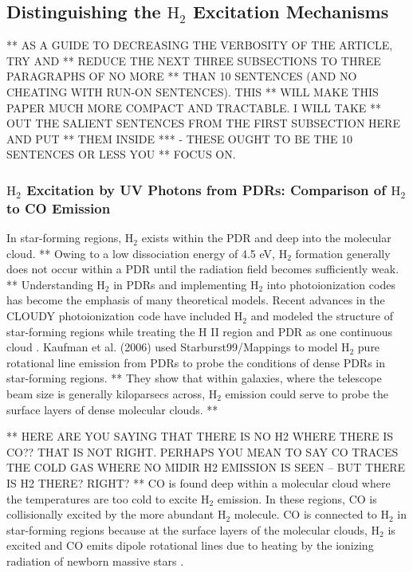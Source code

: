\documentclass[manuscript]{aastex}
\begin{document}
\subsection{Distinguishing the $\mathrm{H_2}$ Excitation Mechanisms}

** AS A GUIDE TO DECREASING THE VERBOSITY OF THE ARTICLE, TRY AND
** REDUCE THE NEXT THREE SUBSECTIONS TO THREE PARAGRAPHS OF NO MORE
** THAN 10 SENTENCES (AND NO CHEATING WITH RUN-ON SENTENCES).  THIS
** WILL MAKE THIS PAPER MUCH MORE COMPACT AND TRACTABLE. I WILL TAKE
** OUT THE SALIENT SENTENCES FROM THE FIRST SUBSECTION HERE AND PUT
** THEM INSIDE *** - THESE OUGHT TO BE THE 10 SENTENCES OR LESS YOU
** FOCUS ON.

\subsubsection{$\mathrm{H_2}$ Excitation by UV Photons from PDRs: Comparison of $\mathrm{H_2}$ to CO Emission}

In star-forming regions, $\mathrm{H_2}$ exists within the PDR and deep
into the molecular cloud.  ** Owing to a low dissociation energy of 4.5
eV, $\mathrm{H_2}$ formation generally does not occur within a PDR
until the radiation field becomes sufficiently weak.  ** Understanding
$\mathrm{H_2}$ in PDRs and implementing $\mathrm{H_2}$ into
photoionization codes has become the emphasis of many theoretical
models.  Recent advances in the CLOUDY photoionization code have
included $\mathrm{H_2}$ and modeled the structure of star-forming
regions while treating the H II region and PDR as one continuous cloud
\citep{shaw05, abel05}.  Kaufman et al. (2006) used
Starburst99/Mappings to model $\mathrm{H_2}$ pure rotational line
emission from PDRs to probe the conditions of dense PDRs in
star-forming regions.  ** They show that within galaxies, where the
telescope beam size is generally kiloparsecs across, $\mathrm{H_2}$
emission could serve to probe the surface layers of dense molecular
clouds. **

** HERE ARE YOU SAYING THAT THERE IS NO H2 WHERE THERE IS CO??  THAT IS NOT RIGHT. PERHAPS YOU MEAN TO SAY CO TRACES THE COLD GAS WHERE NO MIDIR H2 EMISSION IS SEEN -- BUT THERE IS H2 THERE? RIGHT? **
CO is found deep within a molecular cloud where the temperatures are
too cold to excite $\mathrm{H_2}$ emission.  In these regions, CO is
collisionally excited by the more abundant $\mathrm{H_2}$ molecule.
CO is connected to $\mathrm{H_2}$ in star-forming regions because at
the surface layers of the molecular clouds, $\mathrm{H_2}$ is excited
and CO emits dipole rotational lines due to heating by the ionizing
radiation of newborn massive stars \citep{all04}.
\end{document}
